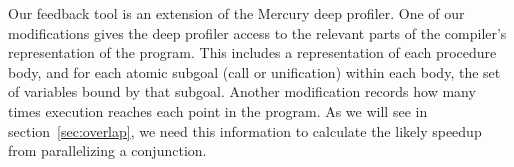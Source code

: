 Our feedback tool is an extension of the Mercury deep profiler.
One of our modifications gives the deep profiler access
to the relevant parts of the compiler's representation of the program.
This includes a representation of each procedure body,
and for each atomic subgoal (call or unification) within each body,
the set of variables bound by that subgoal.
Another modification records
how many times execution reaches each point in the program.
As we will see in section~\ref{sec:overlap},
we need this information
to calculate the likely speedup from parallelizing a conjunction.



